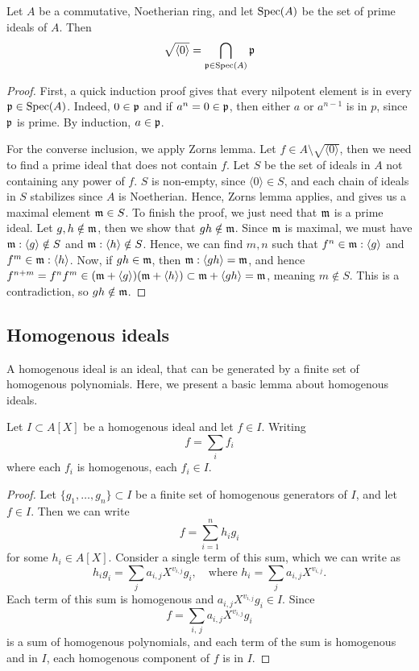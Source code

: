 \begin{theorem}\label{thm:nil_rad_is_cap_primes}
  Let $A$ be a commutative, Noetherian ring, and let $\operatorname{Spec}(A)$ be the set of prime ideals of $A$. Then
  \[\sqrt{\langle 0 \rangle} = \bigcap_{\mathfrak p \in \operatorname{Spec}(A)} \mathfrak p\]
\end{theorem}
\begin{proof}
  First, a quick induction proof gives that every nilpotent element is in every $\mathfrak p \in \operatorname{Spec}(A)$. Indeed, $0 \in \mathfrak p$ and if $a^{n} = 0 \in \mathfrak p$, then either $a$ or $a^{n-1}$ is in $p$, since $\mathfrak p$ is prime. By induction, $a \in \mathfrak p$.

  For the converse inclusion, we apply Zorns lemma. Let $f \in A \setminus \sqrt{\langle 0 \rangle}$, then we need to find a prime ideal that does not contain $f$. Let $S$ be the set of ideals in $A$ not containing any power of $f$. $S$ is non-empty, since $\langle 0 \rangle \in S$, and each chain of ideals in $S$ stabilizes since $A$ is Noetherian. Hence, Zorns lemma applies, and gives us a maximal element $\mathfrak{m} \in S$. To finish the proof, we just need that $\mathfrak{m}$ is a prime ideal. Let $g, h \notin \mathfrak{m}$, then we show that $g h \notin \mathfrak{m}$. Since $\mathfrak{m}$ is maximal, we must have $\mathfrak{m} : \langle g \rangle \notin S$ and $\mathfrak{m} : \langle h \rangle \notin S$. Hence, we can find $m, n$ such that $f^{n} \in \mathfrak{m} : \langle g \rangle$ and $f^{m} \in \mathfrak{m} : \langle h \rangle$. Now, if $g h \in \mathfrak{m}$, then $\mathfrak{m} : \langle g h \rangle = \mathfrak{m}$, and hence $f^{n + m} = f^{n} f^{m} \in (\mathfrak{m} + \langle g \rangle)(\mathfrak{m} + \langle h \rangle) \subset \mathfrak{m} + \langle g h \rangle = \mathfrak{m}$, meaning $m \notin S$. This is a contradiction, so $g h \notin \mathfrak{m}$.
\end{proof}




\subsection{Homogenous ideals}

A homogenous ideal is an ideal, that can be generated by a finite set of homogenous polynomials. Here, we present a basic lemma about homogenous ideals.

\begin{lemma}\label{lem:homo_components}
  Let $I \subset A[X]$ be a homogenous ideal and let $f \in I$. Writing
  \[f = \sum_{i} f_{i}\]
  where each $f_{i}$ is homogenous, each $f_{i} \in I$.
\end{lemma}
\begin{proof}
  Let $\{g_{1}, \dots, g_{n}\} \subset I$ be a finite set of homogenous generators of $I$, and let $f \in I$. Then we can write
  \[f = \sum_{i=1}^{n} h_{i} g_{i}\]
  for some $h_{i} \in A[X]$. Consider a single term of this sum, which we can write as
  \[h_{i} g_{i} = \sum_{j} a_{i, j}X^{v_{i,j}} g_{i}, \quad \text{where } h_{i} = \sum_{j} a_{i, j}X^{v_{i,j}}.\]
  Each term of this sum is homogenous and $a_{i,j} X^{v_{i,j}} g_{i} \in I$. Since
  \[f = \sum_{i,\,j} a_{i,j} X^{v_{i, j}} g_{i}\]
  is a sum of homogenous polynomials, and each term of the sum is homogenous and in $I$, each homogenous component of $f$ is in $I$.
\end{proof}

